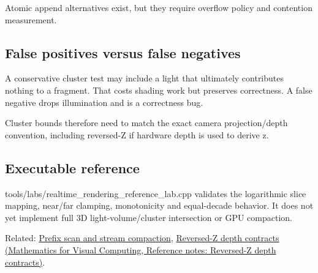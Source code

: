 Atomic append alternatives exist, but they require overflow policy and contention measurement.

\subsection{False positives versus false negatives}\label{appendix-b0efeb3f3648-false-positives-versus-false-negatives}

\hypertarget{appendix-b0efeb3f3648-false-positives-versus-false-negatives}{}

A conservative cluster test may include a light that ultimately contributes nothing to a fragment. That costs shading work but preserves correctness. A false negative drops illumination and is a correctness bug.

Cluster bounds therefore need to match the exact camera projection/depth convention, including reversed-Z if hardware depth is used to derive z.

\subsection{Executable reference}\label{appendix-b0efeb3f3648-executable-reference}

\hypertarget{appendix-b0efeb3f3648-executable-reference}{}

tools/labs/realtime\_rendering\_reference\_lab.cpp validates the logarithmic slice mapping, near/far clamping, monotonicity and equal-decade behavior. It does not yet implement full 3D light-volume/cluster intersection or GPU compaction.

Related: \hyperref[appendix-f2ee4d086415]{Prefix scan and stream compaction}, \href{../02-Mathematics-for-Visual-Computing/main.pdf\#nameddest=appendix-275ec8847057}{Reversed-Z depth contracts (Mathematics for Visual Computing, Reference notes: Reversed-Z depth contracts)}.
